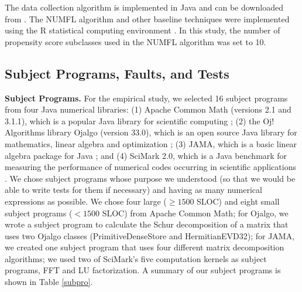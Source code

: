The data collection algorithm is implemented in Java and can be downloaded from \cite{NUMFL}.  The NUMFL algorithm and other baseline techniques were implemented using the R statistical computing environment \cite{R}. In this study, the number of propensity score subclasses used in the NUMFL algorithm was set to 10.

\subsection{Subject Programs, Faults, and Tests}
{\bf Subject Programs.}  For the empirical study, we selected 16 subject programs from four Java numerical libraries: (1) Apache Common Math (versions 2.1 and 3.1.1), which is a popular Java library for scientific computing \cite{Commons}; (2) the Oj! Algorithms library Ojalgo (version 33.0), which is an open source Java library for mathematics, linear algebra and optimization \cite{Oj}; (3) JAMA, which is a basic linear algebra package for Java \cite{JAMA}; and (4) SciMark 2.0, which is a Java benchmark for measuring the performance of numerical codes occurring in scientific applications \cite{SciMark}.  We chose subject programs whose purpose we understood (so that we would be able to write tests for them if necessary) and having as many numerical expressions as possible.  We chose four large ($\ge 1500$ SLOC) and eight small subject programs ($< 1500$ SLOC) from Apache Common Math; for Ojalgo, we wrote a subject program to calculate the Schur decomposition of a matrix that uses two Ojalgo classes (PrimitiveDenseStore and HermitianEVD32); for JAMA, we created one subject program that uses four different matrix decomposition algorithms; we used two of SciMark's five computation kernels as subject programs, FFT and LU factorization.  A summary of our subject programs is shown in Table \ref{subpro}.

